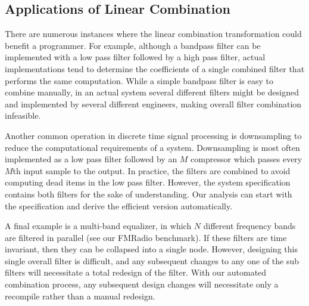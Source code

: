 
\subsection{Applications of Linear Combination}



There are numerous instances where the linear combination
transformation could benefit a programmer.  For example, although a
bandpass filter can be implemented with a low pass filter followed by
a high pass filter, actual implementations tend to determine the
coefficients of a single combined filter that performs the same
computation. While a simple bandpass filter is easy to combine
manually, in an actual system several different filters might be
designed and implemented by several different engineers, making 
overall filter combination infeasible.

Another common operation in discrete time signal processing is
downsampling to reduce the computational requirements of a system.
Downsampling is most often implemented as a low pass filter followed
by an $M$ compressor which passes every $M$th input sample to the
output.  In practice, the filters are combined to avoid computing dead
items in the low pass filter.  However, the system specification
contains both filters for the sake of understanding.  Our analysis can
start with the specification and derive the efficient version automatically.

A final example is a multi-band equalizer, in which $N$ different
frequency bands are filtered in parallel (see our FMRadio benchmark).
If these filters are time invariant, then they can be collapsed into a
single node.  However, designing this single overall filter is
difficult, and any subsequent changes to any one of the sub filters
will necessitate a total redesign of the filter.  With our automated
combination process, any subsequent design changes will necessitate
only a recompile rather than a manual redesign.
